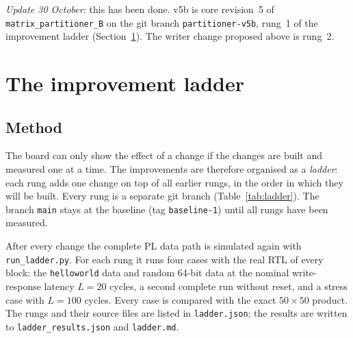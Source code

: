 \documentclass[11pt,a4paper]{article}
\newcommand{\code}[1]{\texttt{#1}}
\begin{document}
\emph{Update 30 October:} this has been done. v5b is core revision~5 of \code{matrix\_partitioner\_B} on the git branch \code{partitioner-v5b}, rung~1 of the improvement ladder (Section~\ref{sec:ladder}). The writer change proposed above is rung~2.


\section{The improvement ladder}\label{sec:ladder}
\subsection{Method}
The board can only show the effect of a change if the changes are built and measured one at a time. The improvements are therefore organised as a \emph{ladder}: each rung adds one change on top of all earlier rungs, in the order in which they will be built. Every rung is a separate git branch (Table~\ref{tab:ladder}). The branch \code{main} stays at the baseline (tag \code{baseline-1}) until all rungs have been measured.

After every change the complete PL data path is simulated again with \code{run\_ladder.py}. For each rung it runs four cases with the real RTL of every block: the \code{helloworld} data and random 64-bit data at the nominal write-response latency $L = 20$ cycles, a second complete run without reset, and a stress case with $L = 100$ cycles. Every case is compared with the exact $50\times50$ product. The rungs and their source files are listed in \code{ladder.json}; the results are written to \code{ladder\_results.json} and \code{ladder.md}.
\end{document}
